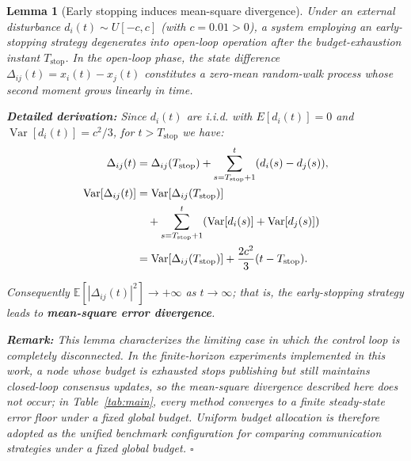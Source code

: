 \documentclass[10pt]{article}
\newtheorem{lemma}{Lemma}[section]
\newcommand{\Tstop}{T_{\text{stop}}}
\DeclareMathOperator{\Var}{Var}
\begin{document}
\begin{lemma}[Early stopping induces mean-square divergence]\label{lem:earlystop}
  Under an external disturbance $d_i(t)\sim U[-c,c]$ (with $c=0.01>0$), a system employing an early-stopping strategy degenerates into open-loop operation after the budget-exhaustion instant $\Tstop$. In the open-loop phase, the state difference $\Delta_{ij}(t)=x_i(t)-x_j(t)$ constitutes a zero-mean random-walk process whose second moment grows linearly in time.

  \textbf{Detailed derivation:} Since $d_i(t)$ are i.i.d. with $E[d_i(t)]=0$ and $\Var[d_i(t)]=c^2/3$, for $t > \Tstop$ we have:
  \begin{align}
    \Delta_{ij}(t) &= \Delta_{ij}(\Tstop) + \sum_{s=\Tstop+1}^{t} (d_i(s) - d_j(s)),\\
    \Var[\Delta_{ij}(t)] &= \Var[\Delta_{ij}(\Tstop)] \notag\\
    &\quad + \sum_{s=\Tstop+1}^{t} (\Var[d_i(s)] + \Var[d_j(s)])\\
    &= \Var[\Delta_{ij}(\Tstop)] + \frac{2c^2}{3}(t-\Tstop).
  \end{align}

  Consequently $\mathbb{E}[|\Delta_{ij}(t)|^2]\to+\infty$ as $t\to\infty$; that is, the early-stopping strategy leads to \textbf{mean-square error divergence}.

  \textbf{Remark:} This lemma characterizes the limiting case in which the control loop is completely disconnected. In the finite-horizon experiments implemented in this work, a node whose budget is exhausted stops publishing but still maintains closed-loop consensus updates, so the mean-square divergence described here does not occur; in Table~\ref{tab:main}, every method converges to a finite steady-state error floor under a fixed global budget. Uniform budget allocation is therefore adopted as the unified benchmark configuration for comparing communication strategies under a fixed global budget. \hfill$\square$
\end{lemma}
\end{document}
